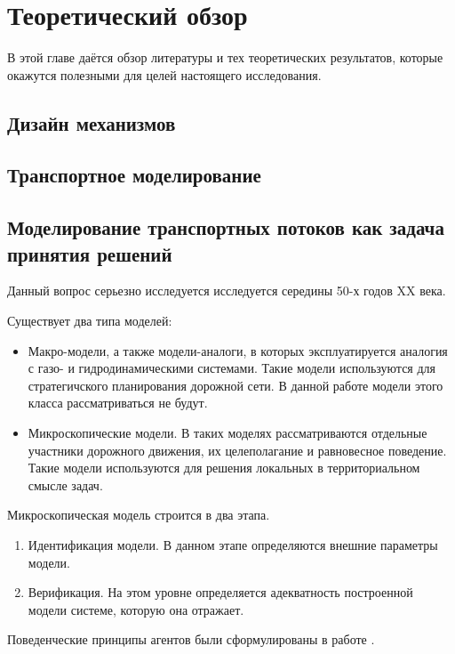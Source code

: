 \chapter{Теоретический обзор}
 
В этой главе даётся обзор литературы и тех теоретических результатов,
которые окажутся полезными для целей настоящего исследования.
 
\section{Дизайн механизмов}
 
\section{Транспортное моделирование}
\section{Моделирование транспортных потоков как задача принятия решений}
 
Данный вопрос серьезно исследуется исследуется середины 50-х годов XX века.
 
Существует два типа моделей:
\begin{itemize}
\item Макро-модели, а также модели-аналоги, в которых эксплуатируется
аналогия с газо- и гидродинамическими системами. Такие модели используются
для стратегичского планирования дорожной сети. В данной работе модели этого
класса рассматриваться не будут.
\item Микроскопические модели. В таких моделях рассматриваются отдельные
участники дорожного движения, их целеполагание и равновесное поведение. Такие
модели используются для решения локальных в территориальном смысле задач.
\end{itemize} \cite[225]{gas}
 
Микроскопическая модель строится в два этапа.
 
\begin{enumerate}
	\item Идентификация модели. В данном этапе определяются внешние параметры модели.
	\item Верификация. На этом уровне определяется адекватность построенной модели системе, которую она отражает.
\end{enumerate} \cite[225-226]{gas}

Поведенческие принципы агентов были сформулированы в работе \cite{wardrop}.



